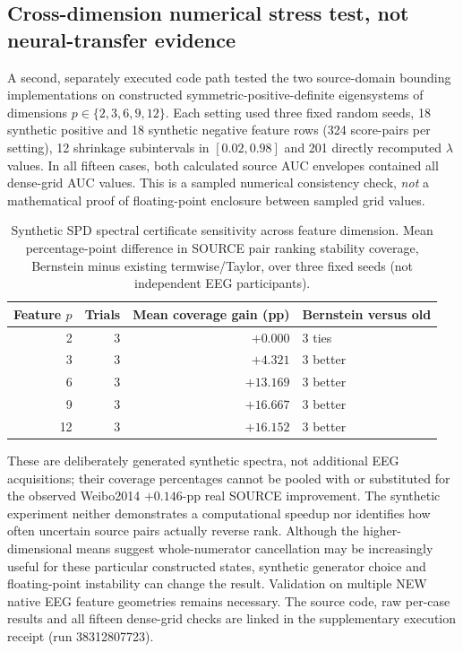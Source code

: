 \subsection{Cross-dimension numerical stress test, not neural-transfer evidence}
\label{sec:p4-synthetic-multidimensional}
A second, separately executed code path tested the two
source-domain bounding implementations on constructed
symmetric-positive-definite eigensystems of dimensions
$p\in\{2,3,6,9,12\}$. Each setting used three fixed
random seeds, 18 synthetic positive and 18 synthetic
negative feature rows (324 score-pairs per setting),
12 shrinkage subintervals in $[0.02,0.98]$ and 201
directly recomputed $\lambda$ values. In all fifteen
cases, both calculated source AUC envelopes contained
all dense-grid AUC values. This is a sampled numerical
consistency check, \emph{not} a mathematical proof of
floating-point enclosure between sampled grid values.

\begin{table}[tb]
\centering\small
\caption{Synthetic SPD spectral certificate sensitivity
across feature dimension. Mean percentage-point
difference in SOURCE pair ranking stability coverage,
Bernstein minus existing termwise/Taylor, over three
fixed seeds (not independent EEG participants).}
\label{tab:p4-synthetic-spd}
\begin{tabular}{rrrl}
\toprule
Feature $p$ & Trials & Mean coverage gain (pp) &
Bernstein versus old\\
\midrule
2 & 3 & $+0.000$ & 3 ties\\
3 & 3 & $+4.321$ & 3 better\\
6 & 3 & $+13.169$ & 3 better\\
9 & 3 & $+16.667$ & 3 better\\
12 & 3 & $+16.152$ & 3 better\\
\bottomrule
\end{tabular}
\end{table}
These are deliberately generated synthetic spectra,
not additional EEG acquisitions; their coverage
percentages cannot be pooled with or substituted for
the observed Weibo2014 $+0.146$-pp real SOURCE improvement.
The synthetic experiment neither demonstrates a
computational speedup nor identifies how often
uncertain source pairs actually reverse rank. Although
the higher-dimensional means suggest whole-numerator
cancellation may be increasingly useful for these
particular constructed states, synthetic generator
choice and floating-point instability can change
the result. Validation on multiple NEW native
EEG feature geometries remains necessary.
The source code, raw per-case results and all
fifteen dense-grid checks are linked in the
supplementary execution receipt (run 38312807723).
